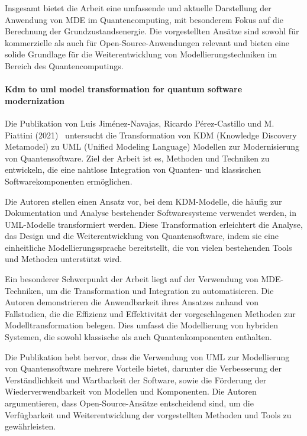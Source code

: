 Insgesamt bietet die Arbeit eine umfassende und aktuelle Darstellung der Anwendung von MDE im Quantencomputing, mit 
besonderem Fokus auf die Berechnung der Grundzustandsenergie. Die vorgestellten Ansätze sind sowohl für kommerzielle 
als auch für Open-Source-Anwendungen relevant und bieten eine solide Grundlage für die Weiterentwicklung von 
Modellierungstechniken im Bereich des Quantencomputings.

\paragraph{Kdm to uml model transformation for quantum software modernization}

Die Publikation von Luis Jiménez-Navajas, Ricardo Pérez-Castillo und M. Piattini (2021)~\cite{jimenez2021kdm} untersucht die Transformation 
von KDM (Knowledge Discovery Metamodel) zu UML (Unified Modeling Language) Modellen zur Modernisierung von 
Quantensoftware. Ziel der Arbeit ist es, Methoden und Techniken zu entwickeln, die eine nahtlose Integration 
von Quanten- und klassischen Softwarekomponenten ermöglichen.

Die Autoren stellen einen Ansatz vor, bei dem KDM-Modelle, die häufig zur Dokumentation und Analyse bestehender 
Softwaresysteme verwendet werden, in UML-Modelle transformiert werden. Diese Transformation erleichtert die 
Analyse, das Design und die Weiterentwicklung von Quantensoftware, indem sie eine einheitliche Modellierungssprache 
bereitstellt, die von vielen bestehenden Tools und Methoden unterstützt wird.

Ein besonderer Schwerpunkt der Arbeit liegt auf der Verwendung von MDE-Techniken, um die Transformation und 
Integration zu automatisieren. Die Autoren demonstrieren die Anwendbarkeit ihres Ansatzes anhand von Fallstudien, 
die die Effizienz und Effektivität der vorgeschlagenen Methoden zur Modelltransformation belegen. Dies umfasst 
die Modellierung von hybriden Systemen, die sowohl klassische als auch Quantenkomponenten enthalten.

Die Publikation hebt hervor, dass die Verwendung von UML zur Modellierung von Quantensoftware mehrere Vorteile 
bietet, darunter die Verbesserung der Verständlichkeit und Wartbarkeit der Software, sowie die Förderung der 
Wiederverwendbarkeit von Modellen und Komponenten. Die Autoren argumentieren, dass Open-Source-Ansätze entscheidend 
sind, um die Verfügbarkeit und Weiterentwicklung der vorgestellten Methoden und Tools zu gewährleisten.

